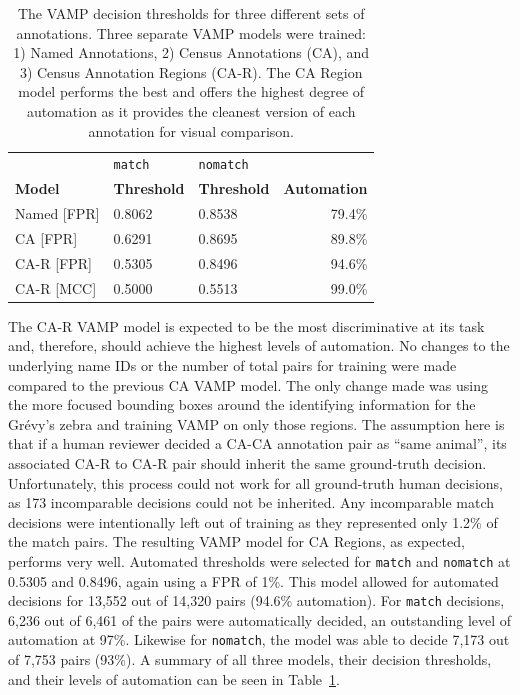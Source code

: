 \begin{table}[!t]
    \caption{The VAMP decision thresholds for three different sets of annotations.  Three separate VAMP models were trained: 1) Named Annotations, 2) Census Annotations (CA), and 3) Census Annotation Regions (CA-R).  The CA Region model performs the best and offers the highest degree of automation as it provides the cleanest version of each annotation for visual comparison.}
    \label{table:vamp-thresholds}
    \begin{center}
        \begin{tabular}{| l | l | l | r |}
            \hline
                           & \texttt{match}     & \texttt{nomatch}   &                     \\
            \textbf{Model} & \textbf{Threshold} & \textbf{Threshold} & \textbf{Automation} \\
            \hline
            Named [FPR]    & 0.8062             & 0.8538             & 79.4\%              \\
            \hline
            CA [FPR]       & 0.6291             & 0.8695             & 89.8\%              \\
            \hline
            CA-R [FPR]     & 0.5305             & 0.8496             & 94.6\%              \\
            \hline
            CA-R [MCC]     & 0.5000             & 0.5513             & 99.0\%              \\
            \hline
        \end{tabular}
    \end{center}
\end{table}

The CA-R VAMP model is expected to be the most discriminative at its task and, therefore, should achieve the highest levels of automation.  No changes to the underlying name IDs or the number of total pairs for training were made compared to the previous CA VAMP model.  The only change made was using the more focused bounding boxes around the identifying information for the Gr\'evy's zebra and training VAMP on only those regions.  The assumption here is that if a human reviewer decided a CA-CA annotation pair as ``same animal'', its associated CA-R to CA-R pair should inherit the same ground-truth decision.  Unfortunately, this process could not work for all ground-truth human decisions, as 173 incomparable decisions could not be inherited.  Any incomparable match decisions were intentionally left out of training as they represented only 1.2\% of the match pairs.  The resulting VAMP model for CA Regions, as expected, performs very well.  Automated thresholds were selected for \texttt{match} and \texttt{nomatch} at 0.5305 and 0.8496, again using a FPR of 1\%.  This model allowed for automated decisions for 13,552 out of 14,320 pairs (94.6\% automation).  For \texttt{match} decisions, 6,236 out of 6,461 of the pairs were automatically decided, an outstanding level of automation at 97\%.  Likewise for \texttt{nomatch}, the model was able to decide 7,173 out of 7,753 pairs (93\%).  A summary of all three models, their decision thresholds, and their levels of automation can be seen in Table~\ref{table:vamp-thresholds}.

